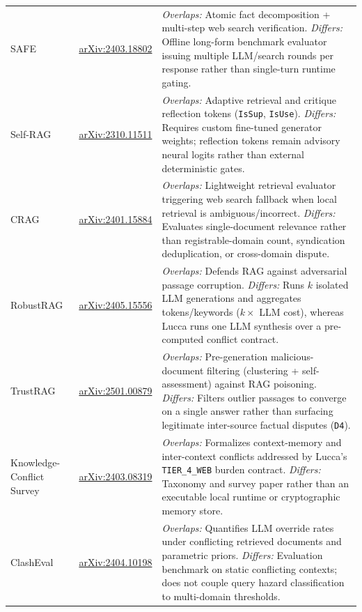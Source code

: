 \documentclass[11pt,a4paper]{article}
\begin{document}
\begin{table}[h]
\begin{tabular}{p{2.7cm}p{2.9cm}p{8.8cm}}
SAFE \cite{wei2024safe} & \href{https://arxiv.org/abs/2403.18802}{arXiv:2403.18802} & \emph{Overlaps:} Atomic fact decomposition + multi-step web search verification. \emph{Differs:} Offline long-form benchmark evaluator issuing multiple LLM/search rounds per response rather than single-turn runtime gating. \\
Self-RAG \cite{asai2023selfrag} & \href{https://arxiv.org/abs/2310.11511}{arXiv:2310.11511} & \emph{Overlaps:} Adaptive retrieval and critique reflection tokens (\texttt{IsSup}, \texttt{IsUse}). \emph{Differs:} Requires custom fine-tuned generator weights; reflection tokens remain advisory neural logits rather than external deterministic gates. \\
CRAG \cite{yan2024crag} & \href{https://arxiv.org/abs/2401.15884}{arXiv:2401.15884} & \emph{Overlaps:} Lightweight retrieval evaluator triggering web search fallback when local retrieval is ambiguous/incorrect. \emph{Differs:} Evaluates single-document relevance rather than registrable-domain count, syndication deduplication, or cross-domain dispute. \\
RobustRAG \cite{xiang2024robustrag} & \href{https://arxiv.org/abs/2405.15556}{arXiv:2405.15556} & \emph{Overlaps:} Defends RAG against adversarial passage corruption. \emph{Differs:} Runs $k$ isolated LLM generations and aggregates tokens/keywords ($k\times$ LLM cost), whereas Lucca runs one LLM synthesis over a pre-computed conflict contract. \\
TrustRAG \cite{zhou2025trustrag} & \href{https://arxiv.org/abs/2501.00879}{arXiv:2501.00879} & \emph{Overlaps:} Pre-generation malicious-document filtering (clustering + self-assessment) against RAG poisoning. \emph{Differs:} Filters outlier passages to converge on a single answer rather than surfacing legitimate inter-source factual disputes (\texttt{D4}). \\
Knowledge-Conflict Survey \cite{xu2024conflicts} & \href{https://arxiv.org/abs/2403.08319}{arXiv:2403.08319} & \emph{Overlaps:} Formalizes context-memory and inter-context conflicts addressed by Lucca's \texttt{TIER\_4\_WEB} burden contract. \emph{Differs:} Taxonomy and survey paper rather than an executable local runtime or cryptographic memory store. \\
ClashEval \cite{wu2024clasheval} & \href{https://arxiv.org/abs/2404.10198}{arXiv:2404.10198} & \emph{Overlaps:} Quantifies LLM override rates under conflicting retrieved documents and parametric priors. \emph{Differs:} Evaluation benchmark on static conflicting contexts; does not couple query hazard classification to multi-domain thresholds. \\

\end{tabular}
\end{table}
\end{document}
